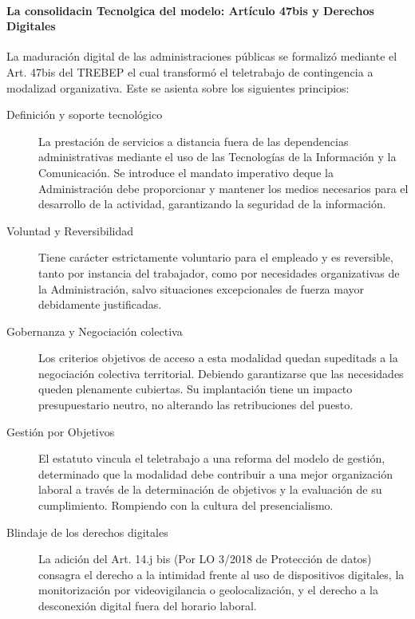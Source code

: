         \paragraph{La consolidacin Tecnolgica del modelo: Artículo 47bis y Derechos Digitales}
        La maduración digital de las administraciones públicas se formalizó mediante el Art. 47bis del TREBEP el cual transformó el teletrabajo de contingencia a modalizad organizativa. Este se asienta sobre los siguientes principios:
        \begin{description}
            \item[Definición y soporte tecnológico] La prestación de servicios a distancia fuera de las dependencias administrativas mediante el uso de las Tecnologías de la Información y la Comunicación. Se introduce el mandato imperativo deque la Administración debe proporcionar y mantener los medios necesarios para el desarrollo de la actividad, garantizando la seguridad de la información.
            \item[Voluntad y Reversibilidad] Tiene carácter estrictamente voluntario para el empleado y es reversible, tanto por instancia del trabajador, como por necesidades organizativas de la Administración, salvo situaciones excepcionales de fuerza mayor debidamente justificadas.
            \item[Gobernanza y Negociación colectiva] Los criterios objetivos de acceso a esta modalidad quedan supeditads a la negociación colectiva territorial. Debiendo garantizarse que las necesidades queden plenamente cubiertas. Su implantación tiene un impacto presupuestario neutro, no alterando las retribuciones del puesto.
            \item[Gestión por Objetivos] El estatuto vincula el teletrabajo a una reforma del modelo de gestión, determinado que la modalidad debe contribuir a una mejor organización laboral a través de la determinación de objetivos y la evaluación de su cumplimiento. Rompiendo con la cultura del presencialismo.
            \item[Blindaje de los derechos digitales] La adición del Art. 14.j bis (Por LO 3/2018 de Protección de datos) consagra el derecho a la intimidad frente al uso de dispositivos digitales, la monitorización por videovigilancia o geolocalización, y el derecho a la desconexión digital fuera del horario laboral.
        \end{description}

